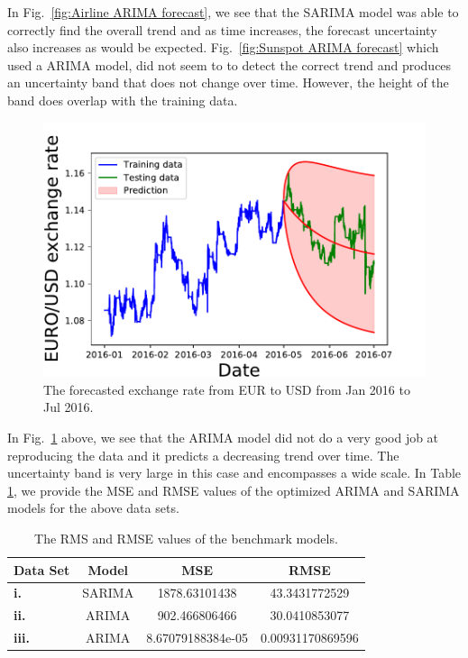 \documentclass[10pt,a4paper]{article}
\begin{document}
In Fig.~\ref{fig:Airline ARIMA forecast}, we see that the SARIMA model was able to correctly find the overall trend and as time increases, the forecast uncertainty also increases as would be expected. Fig.~\ref{fig:Sunspot ARIMA forecast} which used a ARIMA model, did not seem to to detect the correct trend and produces an uncertainty band that does not change over time. However, the height of the band does overlap with the training data. 

\begin{figure}[h]
\begin{center}
\includegraphics[scale=0.4]{EURO_USD_exchange_rate_with_Forecast.pdf}
\caption{The forecasted exchange rate from EUR to USD from Jan 2016 to Jul 2016.}
\label{fig:EURUSD ARIMA forecast}
\centering
\end{center}
\end{figure}

In Fig.~\ref{fig:EURUSD ARIMA forecast} above, we see that the ARIMA model did not do a very good job at reproducing the data and it predicts a decreasing trend over time. The uncertainty band is very large in this case and encompasses a wide scale. In Table \ref{table: RMS values of benchmark models}, we provide the MSE and RMSE values of the optimized ARIMA and SARIMA models for the above data sets.

\begin{table}[h]
\centering
\begin{tabular}{lccc}
Data Set & Model & MSE & RMSE \\ \hline
{\bf i.} & SARIMA & 1878.63101438 & 43.3431772529 \\
{\bf ii.} & ARIMA & 902.466806466 & 30.0410853077 \\
{\bf iii.} & ARIMA & 8.67079188384e-05  &  0.00931170869596 \\ \hline
\end{tabular}
\caption{The RMS and RMSE values of the benchmark models.}
\label{table: RMS values of benchmark models}
\end{table}
\end{document}
